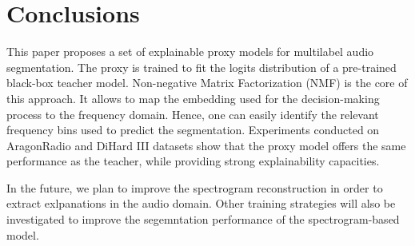 \section{Conclusions}
\label{sect:ccl}
This paper proposes a set of explainable proxy models for multilabel audio segmentation.
The proxy is trained to fit the logits distribution of a pre-trained black-box teacher model.
Non-negative Matrix Factorization (NMF) is the core of this approach.
It allows to map the embedding used for the decision-making process to the frequency domain.
Hence, one can easily identify the relevant frequency bins used to predict the segmentation.
Experiments conducted on AragonRadio and DiHard III datasets show that the proxy model offers the same performance as the teacher, while providing strong explainability capacities.

In the future, we plan to improve the spectrogram reconstruction in order to extract exlpanations in the audio domain.
Other training strategies will also be investigated to improve the segemntation performance of the spectrogram-based model.
